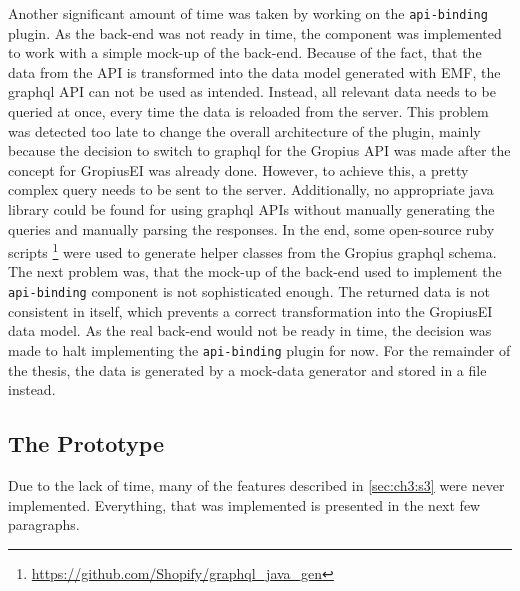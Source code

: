 Another significant amount of time was taken by working on the \lstinline|api-binding| plugin.
As the back-end was not ready in time, the component was implemented to work with a simple mock-up of the back-end.
Because of the fact, that the data from the \gls{API} is transformed into the data model generated with \gls{EMF}, 
the \gls{graphql} \gls{API} can not be used as intended.
Instead, all relevant data needs to be queried at once, every time the data is reloaded from the server.
This problem was detected too late to change the overall architecture of the plugin, 
mainly because the decision to switch to \gls{graphql} for the Gropius \gls{API} was made after the concept for \gls{GropiusEI} was already done.
However, to achieve this, a pretty complex query needs to be sent to the server.
Additionally, no appropriate java library could be found for using \gls{graphql} \glspl{API} without manually generating the queries and manually parsing the responses. 
In the end, some open-source ruby scripts \footnote{\url{https://github.com/Shopify/graphql_java_gen}} were used to generate helper classes from the Gropius \gls{graphql} schema.
The next problem was, that the mock-up of the back-end used to implement the \lstinline|api-binding| component is not sophisticated enough.
The returned data is not consistent in itself, which prevents a correct transformation into the \gls{GropiusEI} data model.
As the real back-end would not be ready in time, the decision was made to halt implementing the \lstinline|api-binding| plugin for now.
For the remainder of the thesis, the data is generated by a mock-data generator and stored in a file instead.

\subsection*{The Prototype}
Due to the lack of time, many of the features described in \cref{sec:ch3:s3} were never implemented.
Everything, that was implemented is presented in the next few paragraphs.


